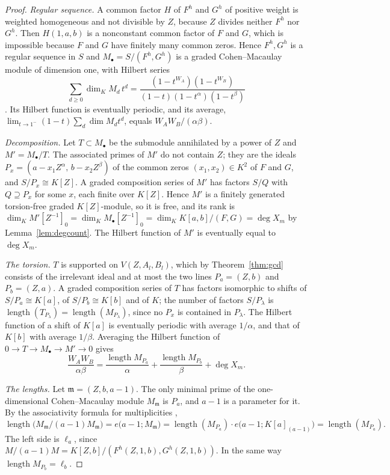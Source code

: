 \documentclass[11pt]{amsart}
\theoremstyle{definition}
\theoremstyle{remark}
\numberwithin{equation}{section}
\DeclareMathOperator{\length}{length}
\begin{document}
\begin{proof}
\emph{Regular sequence.} A common factor $H$ of $F^h$ and $G^h$ of positive weight is weighted homogeneous and not divisible by $Z$, because $Z$ divides neither $F^h$ nor $G^h$. Then $H(1,a,b)$ is a nonconstant common factor of $F$ and $G$, which is impossible because $F$ and $G$ have finitely many common zeros. Hence $F^h,G^h$ is a regular sequence in $S$ and $M_\bullet=S/(F^h,G^h)$ is a graded Cohen--Macaulay module of dimension one, with Hilbert series
\[
\sum_{d\ge0}\dim_K M_d\,t^d=\frac{(1-t^{W_A})(1-t^{W_B})}{(1-t)(1-t^\alpha)(1-t^\beta)}
\]
\cite[Chapter~4]{BH98}. Its Hilbert function is eventually periodic, and its average, $\lim_{t\to1^-}(1-t)\sum_d\dim M_dt^d$, equals $W_AW_B/(\alpha\beta)$.

\emph{Decomposition.} Let $T\subset M_\bullet$ be the submodule annihilated by a power of $Z$ and $M'=M_\bullet/T$. The associated primes of $M'$ do not contain $Z$; they are the ideals $P_x=(a-x_1Z^\alpha,\,b-x_2Z^\beta)$ of the common zeros $(x_1,x_2)\in K^2$ of $F$ and $G$, and $S/P_x\cong K[Z]$. A graded composition series of $M'$ has factors $S/Q$ with $Q\supseteq P_x$ for some $x$, each finite over $K[Z]$. Hence $M'$ is a finitely generated torsion-free graded $K[Z]$-module, so it is free, and its rank is $\dim_K M'[Z^{-1}]_0=\dim_K M_\bullet[Z^{-1}]_0=\dim_KK[a,b]/(F,G)=\deg X_m$ by Lemma~\ref{lem:degcount}. The Hilbert function of $M'$ is eventually equal to $\deg X_m$.

\emph{The torsion.} $T$ is supported on $V(Z,A_l,B_l)$, which by Theorem~\ref{thm:gcd} consists of the irrelevant ideal and at most the two lines $P_a=(Z,b)$ and $P_b=(Z,a)$. A graded composition series of $T$ has factors isomorphic to shifts of $S/P_a\cong K[a]$, of $S/P_b\cong K[b]$ and of $K$; the number of factors $S/P_\lambda$ is $\length(T_{P_\lambda})=\length(M_{P_\lambda})$, since no $P_x$ is contained in $P_\lambda$. The Hilbert function of a shift of $K[a]$ is eventually periodic with average $1/\alpha$, and that of $K[b]$ with average $1/\beta$. Averaging the Hilbert function of $0\to T\to M_\bullet\to M'\to0$ gives
\[
\frac{W_AW_B}{\alpha\beta}=\frac{\length M_{P_a}}{\alpha}+\frac{\length M_{P_b}}{\beta}+\deg X_m .
\]

\emph{The lengths.} Let $\mathfrak m=(Z,b,a-1)$. The only minimal prime of the one-dimensional Cohen--Macaulay module $M_{\mathfrak m}$ is $P_a$, and $a-1$ is a parameter for it. By the associativity formula for multiplicities \cite[Chapter~4]{BH98},
\[
\length\bigl(M_{\mathfrak m}/(a-1)M_{\mathfrak m}\bigr)=e\bigl(a-1;M_{\mathfrak m}\bigr)=\length(M_{P_a})\cdot e\bigl(a-1;K[a]_{(a-1)}\bigr)=\length(M_{P_a}).
\]
The left side is $\ell_a$, since $M/(a-1)M=K[Z,b]/(F^h(Z,1,b),G^h(Z,1,b))$. In the same way $\length M_{P_b}=\ell_b$.
\end{proof}
\end{document}
